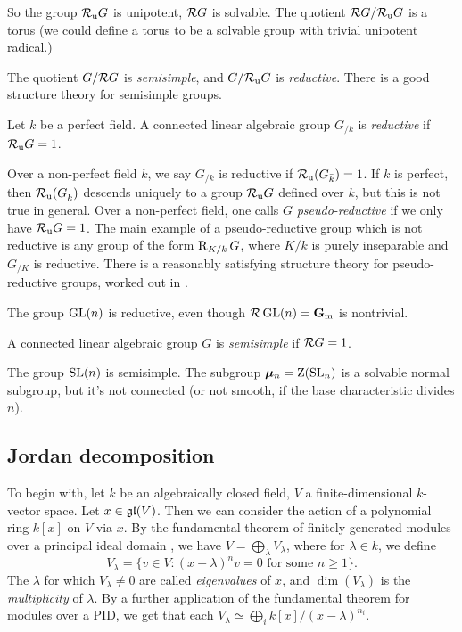 So the group $\mathcal{R}_\mathrm{u} G$ is unipotent, $\mathcal{R} G$ is solvable. The quotient 
$\mathcal{R} G/\mathcal{R}_\mathrm{u} G$ is a torus (we could define a torus to be a solvable group 
with trivial unipotent radical.) 

The quotient $G/\mathcal{R} G$ is \emph{semisimple}, and $G/\mathcal{R}_\mathrm{u} G$ is 
\emph{reductive}. There is a good structure theory for semisimple groups. 

\begin{definition}
Let $k$ be a perfect field. A connected linear algebraic group $G_{/k}$ 
is \emph{reductive} if $\mathcal{R}_\mathrm{u} G=1$. 
\end{definition}

Over a non-perfect field $k$, we say $G_{/k}$ is reductive if 
$\mathcal{R}_\mathrm{u}(G_{\bar k})=1$. If $k$ is perfect, then $\mathcal{R}_\mathrm{u}(G_{\bar k})$ descends 
uniquely to a group $\mathcal{R}_\mathrm{u} G$ defined over $k$, but this is not true in 
general. Over a non-perfect field, one calls $G$ \emph{pseudo-reductive} if we 
only have $\mathcal{R}_\mathrm{u} G=1$. The main example of a pseudo-reductive group which is 
not reductive is any group of the form $\operatorname{R}_{K/k} G$, where $K/k$ is purely 
inseparable and $G_{/K}$ is reductive. There is a reasonably satisfying 
structure theory for pseudo-reductive groups, worked out in 
\cite{conrad-gabber-prasad-2010}. 

\begin{example}
The group $\operatorname{GL}(n)$ is reductive, even though $\mathcal{R} \operatorname{GL}(n)=\mathbf{G}_\mathrm{m}$ is nontrivial. 
\end{example}

\begin{definition}
A connected linear algebraic group $G$ is \emph{semisimple} if 
$\mathcal{R} G=1$. 
\end{definition}

\begin{example}
The group $\operatorname{SL}(n)$ is semisimple. The subgroup $\bm{\mu}_n= \operatorname{Z}(\operatorname{SL}_n)$ is 
a solvable normal subgroup, but it's not connected (or not smooth, if the 
base characteristic divides $n$). 
\end{example}





\subsection{Jordan decomposition}

To begin with, let $k$ be an algebraically closed field, $V$ a 
finite-dimensional $k$-vector space. Let $x\in \mathfrak{gl}(V)$. Then we can consider 
the action of a polynomial ring $k[x]$ on $V$ via $x$. By the 
fundamental theorem of finitely generated modules over a principal ideal 
domain \cite[VII \S2.2 thm.1]{bourbaki-algebra-4-7}, we have 
$V=\bigoplus_\lambda V_\lambda$, where for $\lambda\in k$, we define 
\[
  V_\lambda = \{v\in V:(x-\lambda)^n v=0\text{ for some }n\geqslant 1\} .
\]
The $\lambda$ for which $V_\lambda\ne 0$ are called \emph{eigenvalues} of 
$x$, and $\dim(V_\lambda)$ is the \emph{multiplicity} of $\lambda$. By a 
further application of the fundamental theorem for modules over a PID, we 
get that each $V_\lambda\simeq \bigoplus_i k[x]/(x-\lambda)^{n_i}$. 

